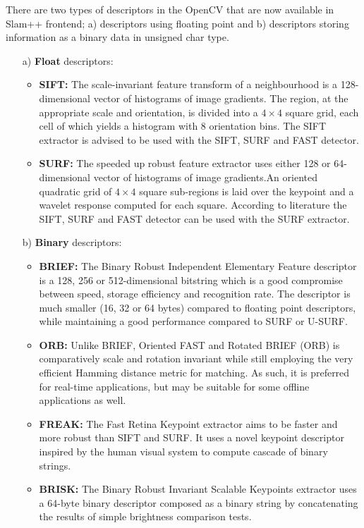 There are two types of descriptors in the OpenCV that are now available in Slam++ frontend; a) descriptors using floating point and b) descriptors storing information as a binary data in unsigned char type.
\begin{itemize}
	\item[a)] \textbf{Float} descriptors:
	
	\begin{itemize}
		\item \textbf{SIFT:} The scale-invariant feature transform of a neighbourhood is a 128-dimensional vector of histograms of image gradients. The region, at the appropriate scale and orientation, is divided into a $4\times 4$ square grid, each cell of which yields a histogram with 8 orientation bins. The SIFT extractor is advised to be used with the SIFT, SURF and FAST detector.
		\item \textbf{SURF:} The speeded up robust feature extractor uses either 128 or 64-dimensional vector of histograms of image gradients.An oriented quadratic grid of $4 \times 4$ square sub-regions is laid over the keypoint and a wavelet response computed for each square. According to literature the SIFT, SURF and FAST detector can be used with the SURF extractor. \cite{www:sift_surf}
	\end{itemize}
	
	\item[b)] \textbf{Binary} descriptors:
	
	\begin{itemize}
		\item \textbf{BRIEF:} The Binary Robust Independent Elementary Feature descriptor is a 128, 256 or 512-dimensional bitstring which is a good compromise between speed, storage efficiency and recognition rate. The descriptor is much smaller (16, 32 or 64 bytes) compared to floating point descriptors, while maintaining a good performance compared to SURF or U-SURF. \cite{article:brief}
		
		\item \textbf{ORB:} Unlike BRIEF, Oriented FAST and Rotated BRIEF (ORB) is comparatively scale and rotation invariant while still employing the very efficient Hamming distance metric for matching. As such, it is preferred for real-time applications, but may be suitable for some offline applications as well. \cite{www:orb}\cite{article:orb}
		
		\item \textbf{FREAK:} The Fast Retina Keypoint extractor aims to be faster and more robust than SIFT and SURF. It uses a novel keypoint descriptor inspired by the human visual system to compute cascade of binary strings.\cite{article:freak}
		
		\item \textbf{BRISK:}  The  Binary Robust Invariant Scalable Keypoints extractor uses a 64-byte binary descriptor composed as a binary string by concatenating the results of simple brightness comparison tests. \cite{article:brisk}
	\end{itemize}
\end{itemize}

